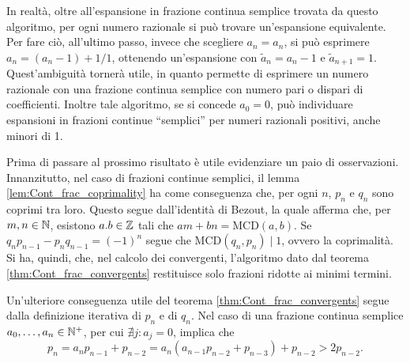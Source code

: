 In realtà, oltre all'espansione in frazione continua semplice trovata da questo algoritmo, per ogni numero razionale si può trovare un'espansione equivalente. Per fare ciò, all'ultimo passo, invece che scegliere $a_n = a_n$, si può esprimere $a_n = (a_n - 1) + 1/1$, ottenendo un'espansione con $\tilde{a}_n = a_n - 1$ e $\tilde{a}_{n+1} = 1$. Quest'ambiguità tornerà utile, in quanto permette di esprimere un numero razionale con una frazione continua semplice con numero pari o dispari di coefficienti.
Inoltre tale algoritmo, se si concede $a_0 = 0$, può individuare espansioni in frazioni continue ``semplici'' per numeri razionali positivi, anche minori di 1.

Prima di passare al prossimo risultato è utile evidenziare un paio di osservazioni.
Innanzitutto, nel caso di frazioni continue semplici, il lemma \ref{lem:Cont_frac_coprimality} ha come conseguenza che, per ogni $n$, $p_n$ e $q_n$ sono coprimi tra loro. 
Questo segue dall'identità di Bezout, la quale afferma che, per $m,n \in \mathbb{N}$, esistono $a.b \in \mathbb{Z}$ tali che $am + bn =$MCD$(a,b)$.
Se $q_np_{n-1} - p_nq_{n-1} = (-1)^n$ segue che MCD$(q_n,p_n) \mid 1$, ovvero la coprimalità.
Si ha, quindi, che, nel calcolo dei convergenti, l'algoritmo dato dal teorema \ref{thm:Cont_frac_convergents} restituisce solo frazioni ridotte ai minimi termini.

Un'ulteriore conseguenza utile del teorema \ref{thm:Cont_frac_convergents} segue dalla definizione iterativa di $p_n$ e di $q_n$. Nel caso di una frazione continua semplice $a_0, \dots, a_n \in \mathbb{N}^+$, per cui $\nexists j : a_j = 0$, implica che 
\begin{equation}\label{eqn:Cont_frac_convergents_increasing}
 p_n = a_np_{n-1} + p_{n-2} = a_n(a_{n-1}p_{n-2} + p_{n-3}) + p_{n-2} > 2p_{n-2}.
\end{equation}


